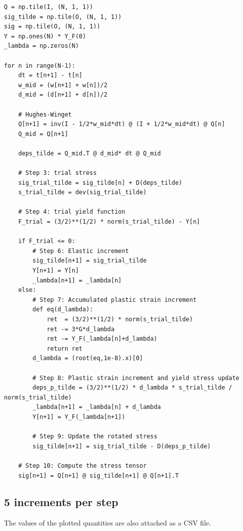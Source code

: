 \documentclass[12pt,a4paper]{article}
\begin{document}
\lstset{style=python}
\begin{lstlisting}
Q = np.tile(I, (N, 1, 1))
sig_tilde = np.tile(O, (N, 1, 1))
sig = np.tile(O, (N, 1, 1))
Y = np.ones(N) * Y_F(0)
_lambda = np.zeros(N)

for n in range(N-1):
    dt = t[n+1] - t[n]
    w_mid = (w[n+1] + w[n])/2
    d_mid = (d[n+1] + d[n])/2

    # Hughes-Winget
    Q[n+1] = inv(I - 1/2*w_mid*dt) @ (I + 1/2*w_mid*dt) @ Q[n]
    Q_mid = Q[n+1] 

    deps_tilde = Q_mid.T @ d_mid* dt @ Q_mid

    # Step 3: trial stress
    sig_trial_tilde = sig_tilde[n] + D(deps_tilde)
    s_trial_tilde = dev(sig_trial_tilde)

    # Step 4: trial yield function
    F_trial = (3/2)**(1/2) * norm(s_trial_tilde) - Y[n]

    if F_trial <= 0:
        # Step 6: Elastic increment
        sig_tilde[n+1] = sig_trial_tilde
        Y[n+1] = Y[n]
        _lambda[n+1] = _lambda[n]
    else:
        # Step 7: Accumulated plastic strain increment
        def eq(d_lambda):
            ret  = (3/2)**(1/2) * norm(s_trial_tilde)
            ret -= 3*G*d_lambda
            ret -= Y_F(_lambda[n]+d_lambda)
            return ret
        d_lambda = (root(eq,1e-8).x)[0]
        
        # Step 8: Plastic strain increment and yield stress update
        deps_p_tilde = (3/2)**(1/2) * d_lambda * s_trial_tilde / norm(s_trial_tilde)
        _lambda[n+1] = _lambda[n] + d_lambda
        Y[n+1] = Y_F(_lambda[n+1])
        
        # Step 9: Update the rotated stress
        sig_tilde[n+1] = sig_trial_tilde - D(deps_p_tilde)
    
    # Step 10: Compute the stress tensor
    sig[n+1] = Q[n+1] @ sig_tilde[n+1] @ Q[n+1].T
\end{lstlisting}

\newpage

\subsection*{5 increments per step}

The values of the plotted quantities are also attached as a CSV file.
\end{document}
